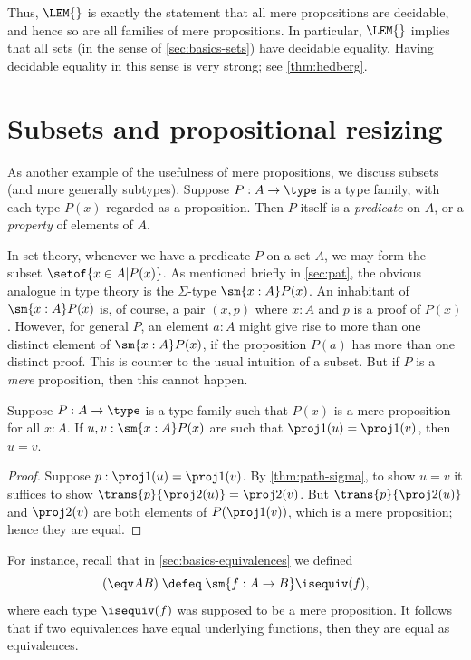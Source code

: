 Thus, $\LEM{}$ is exactly the statement that all mere propositions are decidable, and hence so are all families of mere propositions.
In particular, $\LEM{}$ implies that all sets (in the sense of \cref{sec:basics-sets}) have decidable equality.
Having decidable equality in this sense is very strong; see \cref{thm:hedberg}.

%
%

\section{Subsets and propositional resizing}
\label{subsec:prop-subsets}

%

As another example of the usefulness of mere propositions, we discuss subsets (and more generally subtypes).
Suppose $P:A\to\type$ is a type family, with each type $P(x)$ regarded as a proposition.
Then $P$ itself is a \emph{predicate} on $A$, or a \emph{property} of elements of $A$.

In set theory, whenever we have a predicate $P$ on a set $A$, we may form the subset $\setof{x\in A | P(x)}$.
As mentioned briefly in \cref{sec:pat}, the obvious analogue in type theory is the $\Sigma$-type $\sm{x:A} P(x)$.
An inhabitant of $\sm{x:A} P(x)$ is, of course, a pair $(x,p)$ where $x:A$ and $p$ is a proof of $P(x)$.
However, for general $P$, an element $a:A$ might give rise to more than one distinct element of $\sm{x:A} P(x)$, if the proposition $P(a)$ has more than one distinct proof.
This is counter to the usual intuition of a subset.
But if $P$ is a \emph{mere} proposition, then this cannot happen.

\begin{lem}\label{thm:path-subset}
  Suppose $P:A\to\type$ is a type family such that $P(x)$ is a mere proposition for all $x:A$.
  If $u,v:\sm{x:A} P(x)$ are such that $\proj1(u) = \proj1(v)$, then $u=v$.
\end{lem}
\begin{proof}
  Suppose $p:\proj1(u) = \proj1(v)$.
  By \cref{thm:path-sigma}, to show $u=v$ it suffices to show $\trans{p}{\proj2(u)} = \proj2(v)$.
  But $\trans{p}{\proj2(u)}$ and $\proj2(v)$ are both elements of $P(\proj1(v))$, which is a mere proposition; hence they are equal.
\end{proof}

For instance, recall that in \cref{sec:basics-equivalences} we defined
\[(\eqv A B) \;\defeq\; \sm{f:A\to B} \isequiv (f),\]
where each type $\isequiv (f)$ was supposed to be a mere proposition.
It follows that if two equivalences have equal underlying functions, then they are equal as equivalences.

